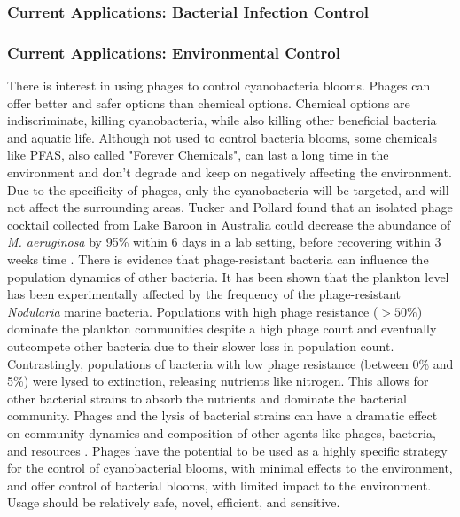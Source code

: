 \subsubsection{Current Applications: Bacterial Infection Control}


\subsubsection{Current Applications: Environmental Control}
There is interest in using phages to control cyanobacteria blooms. Phages can offer better and safer options than chemical options. Chemical options are indiscriminate, killing cyanobacteria, while also killing other beneficial bacteria and aquatic life. Although not used to control bacteria blooms, some chemicals like PFAS, also called "Forever Chemicals", can last a long time in the environment and don't degrade and keep on negatively affecting the environment. Due to the specificity of phages, only the cyanobacteria will be targeted, and will not affect the surrounding areas. Tucker and Pollard found that an isolated phage cocktail collected from Lake Baroon in Australia could decrease the abundance of \textit{M. aeruginosa} by 95\% within 6 days in a lab setting, before recovering within 3 weeks time \cite{tuckerIdentificationCyanophageMaLBP2005}. \newline 
There is evidence that phage-resistant bacteria can influence the population dynamics of other bacteria. It has been shown that the plankton level has been experimentally affected by the frequency of the phage-resistant \textit{Nodularia} marine bacteria. Populations with high phage resistance ($>50\%$) dominate the plankton communities despite a high phage count and eventually outcompete other bacteria due to their slower loss in population count. Contrastingly, populations of bacteria with low phage resistance (between 0\% and 5\%) were lysed to extinction, releasing nutrients like nitrogen. This allows for other bacterial strains to absorb the nutrients and dominate the bacterial community. Phages and the lysis of bacterial strains can have a dramatic effect on community dynamics and composition of other agents like phages, bacteria, and resources \cite{colomaFrequencyVirusresistantHosts2019}. Phages have the potential to be used as a highly specific strategy for the control of cyanobacterial blooms, with minimal effects to the environment, and offer control of bacterial blooms, with limited impact to the environment. Usage should be relatively safe, novel, efficient, and sensitive. \newline 

